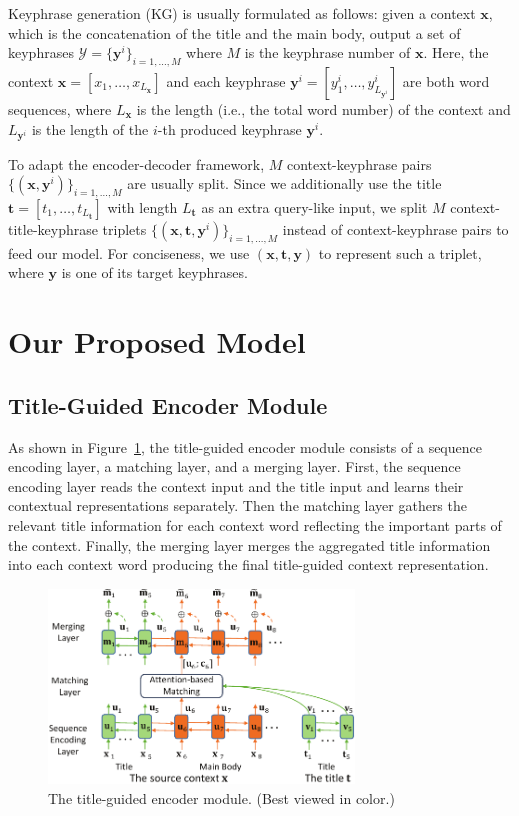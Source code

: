 \documentclass[letterpaper]{article} %
\begin{document}
Keyphrase generation (KG) is usually formulated as follows: given a context $\mathbf{x}$, which is the concatenation of the title and the main body, output a set of keyphrases $\mathcal{Y}=\{\mathbf{y}^i\}_{i=1,\dots,M}$ where $M$ is the keyphrase number of $\mathbf{x}$.  
Here, the context $\mathbf{x}=[x_1,\dots,x_{L_{\mathbf{x}}}]$ and each keyphrase $\mathbf{y}^i=[y_1^i,\dots,y^i_{L_{\mathbf{y}^i}}]$ are both word sequences, where $L_{\mathbf{x}}$ is the length (i.e., the total word number) of the context and $L_{\mathbf{y}^i}$ is the length of the $i$-th produced keyphrase $\mathbf{y}^i$. 

To adapt the encoder-decoder framework, $M$ context-keyphrase pairs $\{(\mathbf{x}, \mathbf{y}^i)\}_{i=1,\dots,M}$ are usually split. Since we additionally use the title $\mathbf{t}=[t_1,\dots,t_{L_{\mathbf{t}}}]$ with length $L_{\mathbf{t}}$ as an extra query-like input, we split $M$ context-title-keyphrase triplets $\{(\mathbf{x}, \mathbf{t}, \mathbf{y}^i)\}_{i=1,\dots,M}$ instead of context-keyphrase pairs to feed our model. For conciseness, we use $(\mathbf{x}, \mathbf{t}, \mathbf{y})$ to represent such a triplet, where $\mathbf{y}$ is one of its target keyphrases.

\section{Our Proposed Model} \label{section: proposed_model}
\subsection{Title-Guided Encoder Module}
As shown in Figure~\ref{figure: title-guided encoder module}, the title-guided encoder module consists of a sequence encoding layer, a matching layer, and a merging layer. First, the sequence encoding layer reads the context input and the title input and learns their contextual representations separately. Then the matching layer gathers the relevant title information for each context word reflecting the important parts of the context. Finally, the merging layer merges the aggregated title information into each context word producing the final title-guided context representation.

\begin{figure}[t]
\centering
\includegraphics[width=3.2in]{figures/PaperID3210_TGNet_encoding_module_cmyk.pdf}
\caption{The title-guided encoder module. (Best viewed in color.)}
\label{figure: title-guided encoder module}
\end{figure}
\end{document}

